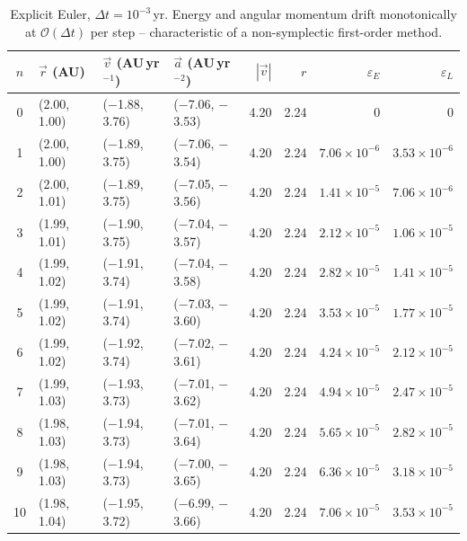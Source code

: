 \begin{table}[H]
    \centering
    \scriptsize
    \setlength{\tabcolsep}{4pt}
    \begin{tabular}{c l l l r r r r}
        \hline
        $n$ & $\vec{r}$ (AU) & $\vec{v}$ (AU\,yr$^{-1}$) & $\vec{a}$ (AU\,yr$^{-2}$) & $|\vec{v}|$ & $r$ & $\varepsilon_E$ & $\varepsilon_L$ \\
        \hline
        0  & (2.00, 1.00) & ($-$1.88, 3.76)  & ($-$7.06, $-$3.53) & 4.20 & 2.24 & $0$ & $0$ \\
        1  & (2.00, 1.00) & ($-$1.89, 3.75)  & ($-$7.06, $-$3.54) & 4.20 & 2.24 & $7.06\!\times\!10^{-6}$  & $3.53\!\times\!10^{-6}$ \\
        2  & (2.00, 1.01) & ($-$1.89, 3.75)  & ($-$7.05, $-$3.56) & 4.20 & 2.24 & $1.41\!\times\!10^{-5}$  & $7.06\!\times\!10^{-6}$ \\
        3  & (1.99, 1.01) & ($-$1.90, 3.75)  & ($-$7.04, $-$3.57) & 4.20 & 2.24 & $2.12\!\times\!10^{-5}$  & $1.06\!\times\!10^{-5}$ \\
        4  & (1.99, 1.02) & ($-$1.91, 3.74)  & ($-$7.04, $-$3.58) & 4.20 & 2.24 & $2.82\!\times\!10^{-5}$  & $1.41\!\times\!10^{-5}$ \\
        5  & (1.99, 1.02) & ($-$1.91, 3.74)  & ($-$7.03, $-$3.60) & 4.20 & 2.24 & $3.53\!\times\!10^{-5}$  & $1.77\!\times\!10^{-5}$ \\
        6  & (1.99, 1.02) & ($-$1.92, 3.74)  & ($-$7.02, $-$3.61) & 4.20 & 2.24 & $4.24\!\times\!10^{-5}$  & $2.12\!\times\!10^{-5}$ \\
        7  & (1.99, 1.03) & ($-$1.93, 3.73)  & ($-$7.01, $-$3.62) & 4.20 & 2.24 & $4.94\!\times\!10^{-5}$  & $2.47\!\times\!10^{-5}$ \\
        8  & (1.98, 1.03) & ($-$1.94, 3.73)  & ($-$7.01, $-$3.64) & 4.20 & 2.24 & $5.65\!\times\!10^{-5}$  & $2.82\!\times\!10^{-5}$ \\
        9  & (1.98, 1.03) & ($-$1.94, 3.73)  & ($-$7.00, $-$3.65) & 4.20 & 2.24 & $6.36\!\times\!10^{-5}$  & $3.18\!\times\!10^{-5}$ \\
        10 & (1.98, 1.04) & ($-$1.95, 3.72)  & ($-$6.99, $-$3.66) & 4.20 & 2.24 & $7.06\!\times\!10^{-5}$  & $3.53\!\times\!10^{-5}$ \\
        \hline
    \end{tabular}
    \caption{Explicit Euler, $\Delta t = 10^{-3}$\,yr. Energy and angular momentum drift monotonically at $\mathcal{O}(\Delta t)$ per step -- characteristic of a non-symplectic first-order method.}
\end{table}

